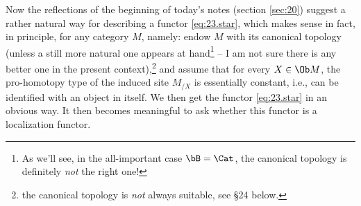 Now the reflections of the beginning of today's notes (section \ref{sec:20})
suggest a rather natural way for describing a functor
\eqref{eq:23.star}, which makes sense in fact, in principle, for any
category $M$, namely: endow $M$ with its canonical topology (unless a
still more natural one appears at hand\footnote{As we'll see, in the all-important case $\bB = \Cat$, the canonical topology is definitely \emph{not} the right one!} -- I am not sure there is any
better one in the present context),\footnote{ the canonical
  topology is \emph{not} always suitable, see \S24 below.} and assume
that for every $X\in\Ob M$, the pro-homotopy type of the induced site
$M_{/X}$ is essentially constant, i.e., can be identified with an
object in \Hot{} itself. We then get the functor \eqref{eq:23.star} in
an obvious way. It then becomes meaningful to ask whether this functor
is a localization functor.

